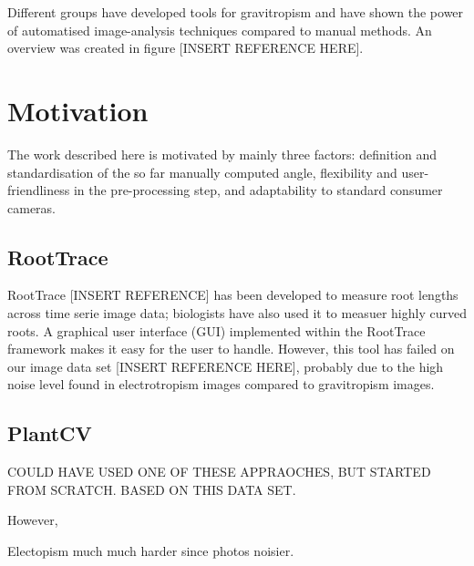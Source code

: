 Different groups have developed tools for gravitropism and have shown the power of automatised image-analysis techniques compared to manual methods. An overview was created in figure [INSERT REFERENCE HERE].



\section{Motivation}
The work described here is motivated by mainly three factors: definition and standardisation  of the so far manually computed angle, flexibility and user-friendliness in the pre-processing step, and adaptability to standard consumer cameras. 


\subsection{RootTrace}

RootTrace [INSERT REFERENCE] has been developed to measure root lengths across time serie image data; biologists have also used it to measuer highly curved roots. A graphical user interface (GUI) implemented within the RootTrace framework makes it easy for the user to handle. However, this tool has failed on our image data set [INSERT REFERENCE HERE], probably due to the high noise level found in electrotropism images compared to gravitropism images.






\subsection{PlantCV}


COULD HAVE USED ONE OF THESE APPRAOCHES, BUT STARTED FROM SCRATCH. BASED ON THIS DATA SET.


However, 


Electopism much much harder since photos noisier.



